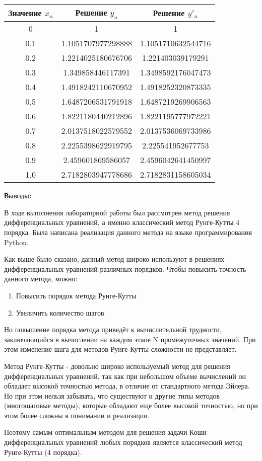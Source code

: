 \documentclass [12pt]{article}
\begin{document}
\begin{center}
\begin{tabular}{ |c|c|c| }
  \hline
  Значение $x_{n}$ & Решение $y_{n}$ & Решение $y'_{n}$ \\ \hline
  0 & 1 & 1 \\ \hline
  0.1 & 1.1051707977298888 & 1.1051710632544716 \\ \hline
  0.2 & 1.2214025180676706 & 1.221403039179291 \\ \hline
  0.3 & 1.349858446117391 & 1.3498592176047473 \\ \hline
  0.4 & 1.4918242110670952 & 1.4918252320873335 \\ \hline
  0.5 & 1.6487206531791918 & 1.6487219269906563 \\ \hline
  0.6 & 1.8221180440212896 & 1.8221195777972221 \\ \hline
  0.7 & 2.0137518022579552 & 2.0137536069733986 \\ \hline
  0.8 & 2.2255398622919795 & 2.225541952677753 \\ \hline
  0.9 & 2.459601869586057 & 2.4596042641450997 \\ \hline
  1.0 & 2.7182803947778686 & 2.7182831158605034 \\ \hline
\end{tabular}
\end{center}

\textsc{\textbf{Выводы:}}

В ходе выполнения лабораторной работы был рассмотрен метод решения дифференциальных уравнений, а именно классический метод Рунге-Кутты 4 порядка. Была написана реализация данного метода на языке программирования Python.

Как выше было сказано, данный метод широко используют в решениях дифференциальных уравнений различных порядков. Чтобы повысить точность данного метода, можно:
\begin{enumerate}
\item Повысить порядок метода Рунге-Кутты
\item Увеличить количество шагов
\end{enumerate}
Но повышение порядка метода приведёт к вычислительной трудности, заключающийся в вычислении на каждом этапе N промежуточных значений. При этом изменение шага для методов Рунге-Кутты сложности не представляет. 

Метод Рунге-Кутты - довольно широко используемый метод для решения дифференциальных уравнений, так как при небольшом объеме вычислений он обладает высокой точностью метода, в отличие от стандартного метода Эйлера. Но при этом нельзя забывать, что существуют и другие типы методов (многошаговые методы), которые обладают еще более высокой точностью, но при этом более сложны в понимании и реализации. 

Поэтому самым оптимальным методом для решения задачи Коши дифференциальных уравнений любых порядков является классический метод Рунге-Кутты (4 порядка).
\end{document}
